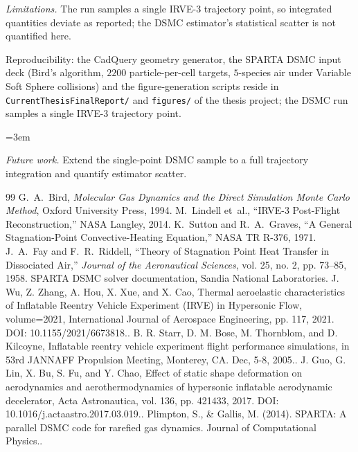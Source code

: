 \documentclass[conference]{IEEEtran}
\begin{document}
\noindent\textit{Limitations.} The run samples a single IRVE-3 trajectory point, so integrated quantities deviate as reported; the DSMC estimator's statistical scatter is not quantified here.\par\vspace{0.3em}
\raggedright\noindent Reproducibility: the CadQuery geometry generator, the SPARTA DSMC input deck (Bird\textquoteright s algorithm, $2200$ particle-per-cell targets, $5$-species air under Variable Soft Sphere collisions) and the figure-generation scripts reside in {\texttt{CurrentThesisFinalReport/}} and {\texttt{figures/}} of the thesis project; the DSMC run samples a single IRVE-3 trajectory point.\par\vspace{0.5em}
\begin{sloppypar} \emergencystretch=3em \raggedright
\noindent\textit{Future work.} Extend the single-point DSMC sample to a full trajectory integration and quantify estimator scatter.\par\vspace{0.3em}
\begin{thebibliography}{99}
 G.~A.~Bird, \emph{Molecular Gas Dynamics and the Direct Simulation Monte Carlo Method}, Oxford University Press, 1994.
 M.~Lindell et~al., ``IRVE-3 Post-Flight Reconstruction,'' NASA Langley, 2014.
 K.~Sutton and R.~A.~Graves, ``A General Stagnation-Point Convective-Heating Equation,'' NASA TR R-376, 1971.
 J.~A.~Fay and F.~R.~Riddell, ``Theory of Stagnation Point Heat Transfer in Dissociated Air,'' \emph{Journal of the Aeronautical Sciences}, vol. 25, no. 2, pp. 73--85, 1958.
 SPARTA DSMC solver documentation, Sandia National Laboratories.
 J. Wu, Z. Zhang, A. Hou, X. Xue, and X. Cao, Thermal aeroelastic characteristics of Inflatable Reentry Vehicle Experiment (IRVE) in Hypersonic Flow, volume=2021, International Journal of Aerospace Engineering, pp. 117, 2021. DOI: 10.1155/2021/6673818..
 B. R. Starr, D. M. Bose, M. Thornblom, and D. Kilcoyne, Inflatable reentry vehicle experiment flight performance simulations, in 53rd JANNAFF Propulsion Meeting, Monterey, CA. Dec, 5-8, 2005..
 J. Guo, G. Lin, X. Bu, S. Fu, and Y. Chao, Effect of static shape deformation on aerodynamics and aerothermodynamics of hypersonic inflatable aerodynamic decelerator, Acta Astronautica, vol. 136, pp. 421433, 2017. DOI: 10.1016/j.actaastro.2017.03.019..
 Plimpton, S., \& Gallis, M. (2014). SPARTA: A parallel DSMC code for rarefied gas dynamics. Journal of Computational Physics..

\end{thebibliography}
\end{sloppypar}
\end{document}

